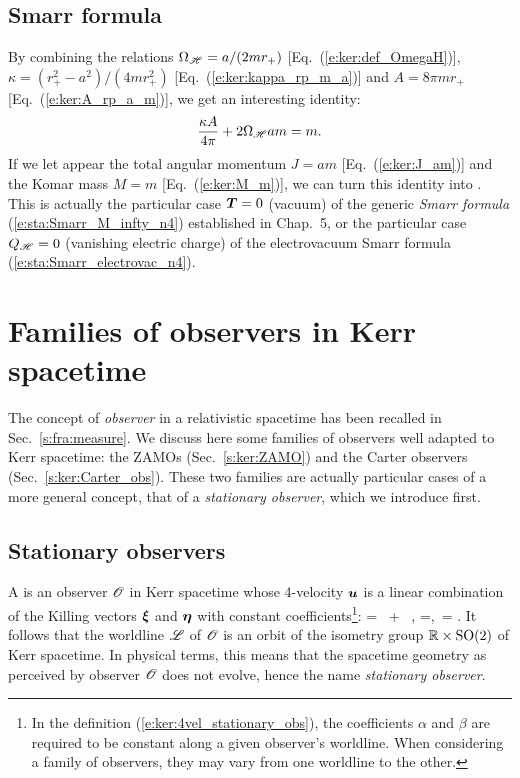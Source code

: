\subsection{Smarr formula}

By combining the relations $\Omega_{\mathscr{H}} = a/(2 m r_+)$ [Eq.~(\ref{e:ker:def_OmegaH})],
$\kappa = (r_+^2 - a^2)/(4 m r_+^2)$ [Eq.~(\ref{e:ker:kappa_rp_m_a})]
and $A = 8\pi m r_+$ [Eq.~(\ref{e:ker:A_rp_a_m})], we get an interesting
identity:
\[
    \frac{\kappa A}{4\pi} + 2 \Omega_{\mathscr{H}} a m   = m .
\]
If we let appear the total angular momentum $J = a m$ [Eq.~(\ref{e:ker:J_am})]
and the Komar mass $M = m$ [Eq.~(\ref{e:ker:M_m})], we can turn this identity
into
\be \label{e:ker:Smarr}
     .
\ee
This is actually the particular case $\bm{T} = 0$ (vacuum) of the generic
\emph{Smarr formula} (\ref{e:sta:Smarr_M_infty_n4})
established in Chap.~5, or the particular
case $Q_{\mathscr{H}}=0$ (vanishing electric charge) of the electrovacuum Smarr formula
(\ref{e:sta:Smarr_electrovac_n4}).


\section{Families of observers in Kerr spacetime} \label{s:ker:observers}

The concept of \emph{observer} in a relativistic spacetime
has been recalled in Sec.~\ref{s:fra:measure}.
We discuss here some families of observers well adapted to Kerr spacetime:
the ZAMOs (Sec.~\ref{s:ker:ZAMO}) and the Carter observers (Sec.~\ref{s:ker:Carter_obs}).
These two families are actually particular cases of a more general concept, that
of a \emph{stationary observer}, which we introduce first.

\subsection{Stationary observers} \label{s:ker:station_obs}

A 
is an observer $\mathscr{O}$ in Kerr spacetime whose 4-velocity $\bm{u}$ is a linear
combination of the Killing vectors $\bm{\xi}$ and $\bm{\eta}$ with constant coefficients\footnote{In
the definition (\ref{e:ker:4vel_stationary_obs}), the coefficients $\alpha$ and $\beta$
are required to be constant along a given observer's worldline. When considering a family of observers,
they may vary from one worldline to the other.}:
\be \label{e:ker:4vel_stationary_obs}
     = \alpha \, \w{\xi} + \beta \, \w{\eta} , \qquad \alpha=,\ \beta= .
\ee
It follows that the worldline $\mathscr{L}$ of $\mathscr{O}$ is an
orbit of the isometry group $\mathbb{R}\times\mathrm{SO}(2)$ of Kerr spacetime. In physical terms,
this means that the spacetime geometry as perceived by observer $\mathscr{O}$ does not evolve,
hence the name \emph{stationary observer}.

